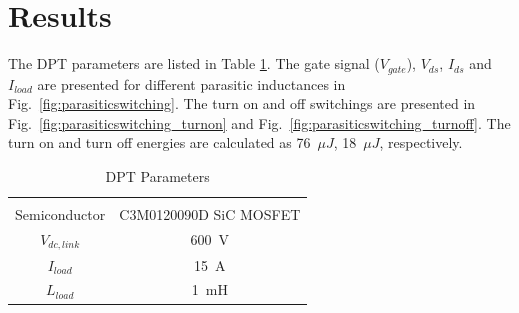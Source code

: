 \documentclass[12pt]{article} %
\begin{document}
\section{Results}
The DPT parameters are listed in Table \ref{tab:DPTpar}. The gate signal ($V_{gate}$), $V_{ds}$, $I_{ds}$ and $I_{load}$ are presented for different parasitic inductances in Fig.~\ref{fig:parasiticswitching}. The turn on and off switchings are presented in Fig.~\ref{fig:parasiticswitching_turnon} and Fig.~\ref{fig:parasiticswitching_turnoff}. The turn on and turn off energies are calculated as 76~$\mu J$, 18~$\mu J$, respectively.

\begin{table}[h]
\centering
\caption{DPT Parameters}
\label{tab:DPTpar}
\begin{tabular}{cc}
\hline \\
Semiconductor      &   C3M0120090D SiC MOSFET   \\
$V_{dc,link}$      &   600~V   \\
$I_{load}$      &   15~A   \\
$L_{load}$      &   1~mH   \\
\hline
\end{tabular}
\end{table}
\end{document}
